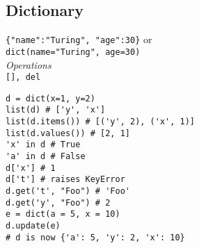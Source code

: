 \subsection{Dictionary}
\texttt{\{"name":"Turing", "age":30\}} or \\
\texttt{dict(name="Turing", age=30)} \\

\textit{Operations} \\
\texttt{[], del}

\begin{lstlisting}
d = dict(x=1, y=2)
list(d) # ['y', 'x']
list(d.items()) # [('y', 2), ('x', 1)]
list(d.values()) # [2, 1]
'x' in d # True
'a' in d # False
d['x'] # 1
d['t'] # raises KeyError
d.get('t', "Foo") # 'Foo'
d.get('y', "Foo") # 2
e = dict(a = 5, x = 10)
d.update(e) 
# d is now {'a': 5, 'y': 2, 'x': 10}
\end{lstlisting}
